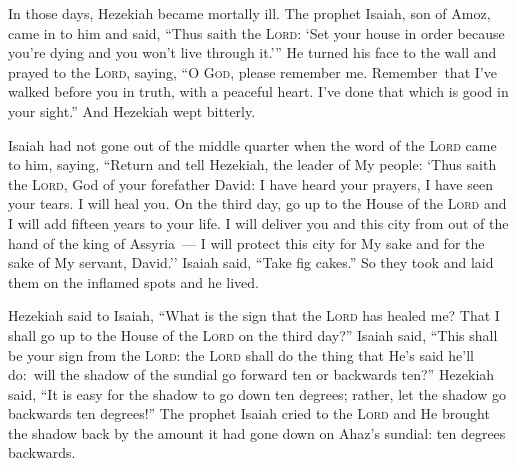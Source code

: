 
\begin{inparaenum}
     In those days, Hezekiah became mortally ill. The prophet Isaiah, son of Amoz, came in to him and said, ``Thus saith the \textsc{Lord}: `Set your house in order because you're dying and you won't live through it.'\thinspace''%
     He turned his face to the wall and prayed to the \textsc{Lord}, saying,%
     ``O \textsc{God}, please remember me. Remember\understood\ that I've walked before you in truth, with a peaceful heart. I've done that which is good in your sight.'' And Hezekiah wept bitterly.%
    
     Isaiah had not gone out of the middle quarter when the word of the \textsc{Lord} came to him, saying,%
     ``Return and tell Hezekiah, the leader of My people: `Thus saith the \textsc{Lord}, God of your forefather David: I have heard your prayers, I have seen your tears. I will heal you. On the third day, go up to the House of the \textsc{Lord}%
     and I will add fifteen years to your life. I will deliver you and this city from out of the hand of the king of Assyria~--- I will protect this city for My sake and for the sake of My servant, David.''%
     Isaiah said, ``Take fig cakes.'' So they took and laid them on the inflamed spots and he lived.%
    
     Hezekiah said to Isaiah, ``What is the sign that the \textsc{Lord} has healed me? That I shall go up to the House of the \textsc{Lord} on the third day?''%
     Isaiah said, ``This shall be your sign from the \textsc{Lord}: the \textsc{Lord} shall do the thing that He's said he'll do:\understood\ will the shadow of the sundial go forward ten or backwards ten?''%
     Hezekiah said, ``It is easy for the shadow to go down ten degrees; rather, let the shadow go backwards ten degrees!''%
     The prophet Isaiah cried to the \textsc{Lord} and He brought the shadow back by the amount it had gone down on Ahaz's sundial: ten degrees backwards.%
    

\end{inparaenum}
